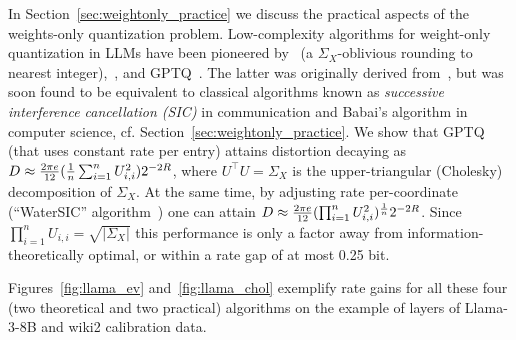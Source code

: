 \documentclass[journal]{IEEEtran}
\begin{document}
In Section~\ref{sec:weightonly_practice} we discuss the practical aspects of the weights-only quantization problem. Low-complexity algorithms for weight-only quantization in LLMs have been pioneered
by~\cite{dettmers2022gpt3} (a $\Sigma_X$-oblivious rounding to nearest integer),~\cite{adaround}, and
GPTQ~\cite{frantar2023optq}. The latter was originally derived from~\cite{hassibi1993optimal}, but
was soon found to be equivalent to classical algorithms known as \emph{successive
interference cancellation (SIC)} in communication and Babai's algorithm in computer science, cf.
Section~\ref{sec:weightonly_practice}. We show that GPTQ (that uses constant rate per entry)
attains distortion decaying as $D\approx {2\pi e\over
12} ({1\over n} \sum_{i=1}^n U_{i,i}^2) 2^{-2R}$, where $U^\top U = \Sigma_X$ is the upper-triangular
(Cholesky) decomposition of $\Sigma_X$. At the same time, by adjusting rate per-coordinate
(``WaterSIC'' algorithm~\cite{lifar2026watersic}) one can
attain $D\approx {2\pi e\over
12} (\prod_{i=1}^n U_{i,i}^2)^{1\over n} 2^{-2R}$. Since $\prod_{i=1}^n U_{i,i} = \sqrt{|\Sigma_X|}$ this
performance is only a factor away from information-theoretically optimal, or within a rate gap of
at most 0.25 bit. 

Figures~\ref{fig:llama_ev} and~\ref{fig:llama_chol} exemplify rate gains for all these four (two
theoretical and two practical) algorithms on the example of layers of Llama-3-8B and wiki2
calibration data.

\end{document}
